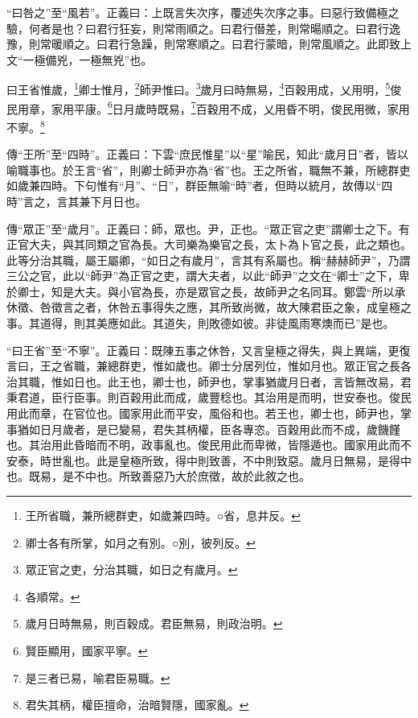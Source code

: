 {\noindent\shu{}\fzkt “曰咎之”至“風若”。正義曰：上既言失次序，覆述失次序之事。曰惡行致備極之驗，何者是也？曰君行狂妄，則常雨順之。曰君行僣差，則常暘順之。曰君行逸豫，則常暖順之。曰君行急躁，則常寒順之。曰君行蒙暗，則常風順之。此即致上文“一極備兇，一極無兇”也。 \par}

曰王省惟歲，\footnote{王所省職，兼所總群吏，如歲兼四時。○省，息井反。}卿士惟月，\footnote{卿士各有所掌，如月之有別。○別，彼列反。}師尹惟曰。\footnote{眾正官之吏，分治其職，如日之有歲月。}歲月曰時無易，\footnote{各順常。}百穀用成，乂用明，\footnote{歲月日時無易，則百穀成。君臣無易，則政治明。}俊民用章，家用平康。\footnote{賢臣顯用，國家平寧。}日月歲時既易，\footnote{是三者已易，喻君臣易職。}百穀用不成，乂用昏不明，俊民用微，家用不寧。\footnote{君失其柄，權臣擅命，治暗賢隱，國家亂。}

{\noindent\zhuan{}\fzbyks 傳“王所”至“四時”。正義曰：下雲“庶民惟星”以“星”喻民，知此“歲月日”者，皆以喻職事也。於王言“省”，則卿士師尹亦為“省”也。王之所省，職無不兼，所總群吏如歲兼四時。下句惟有“月”、“日”，群臣無喻“時”者，但時以統月，故傳以“四時”言之，言其兼下月日也。 \par}

{\noindent\zhuan{}\fzbyks 傳“眾正”至“歲月”。正義曰：師，眾也。尹，正也。“眾正官之吏”謂卿士之下。有正官大夫，與其同類之官為長。大司樂為樂官之長，太卜為卜官之長，此之類也。此等分治其職，屬王屬卿，“如日之有歲月”，言其有系屬也。稱“赫赫師尹”，乃謂三公之官，此以“師尹”為正官之吏，謂大夫者，以此“師尹”之文在“卿士”之下，卑於卿士，知是大夫。與小官為長，亦是眾官之長，故師尹之名同耳。鄭雲“所以承休徵、咎徵言之者，休咎五事得失之應，其所致尚微，故大陳君臣之象，成皇極之事。其道得，則其美應如此。其道失，則敗德如彼。非徒風雨寒燠而已”是也。 \par}

{\noindent\shu{}\fzkt “曰王省”至“不寧”。正義曰：既陳五事之休咎，又言皇極之得失，與上異端，更復言曰，王之省職，兼總群吏，惟如歲也。卿士分居列位，惟如月也。眾正官之長各治其職，惟如日也。此王也，卿士也，師尹也，掌事猶歲月日者，言皆無改易，君秉君道，臣行臣事。則百穀用此而成，歲豐稔也。其治用是而明，世安泰也。俊民用此而章，在官位也。國家用此而平安，風俗和也。若王也，卿士也，師尹也，掌事猶如日月歲者，是已變易，君失其柄權，臣各專恣。百穀用此而不成，歲饑饉也。其治用此昏暗而不明，政事亂也。俊民用此而卑微，皆隱遁也。國家用此而不安泰，時世亂也。此是皇極所致，得中則致善，不中則致惡。歲月日無易，是得中也。既易，是不中也。所致善惡乃大於庶徵，故於此敘之也。 \par}

